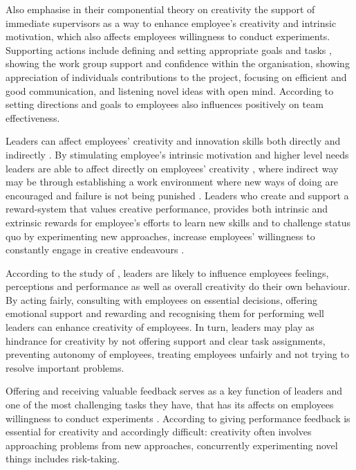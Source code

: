 Also \citet{amabile2004leader} emphasise in their componential theory on creativity the support of immediate supervisors as a way to enhance employee's creativity and intrinsic motivation, which also affects employees willingness to conduct experiments. Supporting actions include defining and setting appropriate goals and tasks \citet{amabile1998kill}, showing the work group support and confidence within the organisation, showing appreciation of individuals contributions to the project, focusing on efficient and good communication, and listening novel ideas with open mind. \citep{amabile2004leader} According to \citet{hackman1987design} setting directions and goals to employees also influences positively on team effectiveness.

Leaders can affect employees' creativity and innovation skills both directly and indirectly \citep{jung2003role}. By stimulating employee's intrinsic motivation and higher level needs leaders are able to affect directly on employees' creativity \citep{tierney1999examination}, where indirect way may be through establishing a work environment where new ways of doing are encouraged and failure is not being punished \citep{amabile1996assessing}. Leaders who create and support a reward-system that values creative performance, provides both intrinsic and extrinsic rewards for employee's efforts to learn new skills and to challenge status quo by experimenting new approaches, increase employees' willingness to constantly engage in creative endeavours \citep{jung2001transformational,mumford1988creativity}.

According to the study of \citet{amabile2004leader}, leaders are likely to influence employees feelings, perceptions and performance as well as overall creativity do their own behaviour. By acting fairly, consulting with employees on essential decisions, offering emotional support and rewarding and recognising them for performing well leaders can enhance creativity of employees. In turn, leaders may play as hindrance for creativity by not offering support and clear task assignments, preventing autonomy of employees, treating employees unfairly and not trying to resolve important problems. 

Offering and receiving valuable feedback serves as a key function of leaders and one of the most challenging tasks they have, that has its affects on employees willingness to conduct experiments \citep{amabile2004leader,amabile1998kill}. According to \citet{shalley2004leaders} giving performance feedback is essential for creativity and accordingly difficult: creativity often involves approaching problems from new approaches, concurrently experimenting novel things includes risk-taking. 

